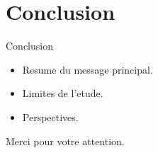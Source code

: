 \documentclass[aspectratio=169]{beamer}
\begin{document}
\section{Conclusion}

\begin{frame}{Conclusion}
  \begin{itemize}
    \item Resume du message principal.
    \item Limites de l'etude.
    \item Perspectives.
  \end{itemize}
\end{frame}

\begin{frame}
  \centering
  \Large Merci pour votre attention.
\end{frame}
\end{document}

